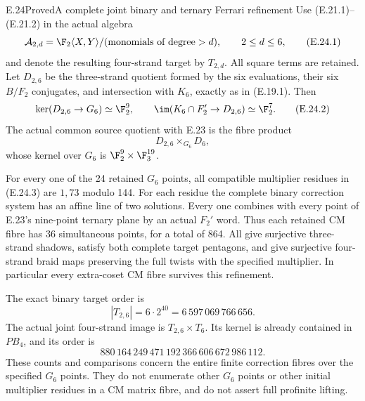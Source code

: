 \begin{statement}{E.24}{Proved}{A complete joint binary and ternary Ferrari refinement}
Use (E.21.1)--(E.21.2) in the actual algebra
\[
 \mathcal A_{2,d}=\F_2\langle X,Y\rangle/
                 (\text{monomials of degree}>d),
 \qquad 2\leq d\leq6,
 \tag{E.24.1}
\]
and denote the resulting four-strand target by
$T_{2,d}$. All square terms are retained.
Let $D_{2,6}$ be the three-strand quotient
formed by the six evaluations, their six
$B/F_2$ conjugates, and intersection with
$K_6$, exactly as in (E.19.1). Then
\[
 \ker(D_{2,6}\to G_6)\simeq\F_2^9,
 \qquad
 \im(K_6\cap F_2'\to D_{2,6})\simeq\F_2^7.
 \tag{E.24.2}
\]
The actual common source quotient with
E.23 is the fibre product
\[
 D_{2,6}\mathbin{\times_{G_6}}D_6,
 \tag{E.24.3}
\]
whose kernel over $G_6$ is
$\F_2^9\times\F_3^{19}$.

For every one of the 24 retained
$G_6$ points, all compatible multiplier
residues in (E.24.3) are $1,73$ modulo
144. For each residue the complete
binary correction system has an
affine line of two solutions.
Every one combines with every
point of E.23's nine-point ternary
plane by an actual $F_2'$ word.
Thus each retained CM fibre has
36 simultaneous points, for a
total of 864. All give surjective
three-strand shadows, satisfy both
complete target pentagons, and
give surjective four-strand braid
maps preserving the full twists
with the specified multiplier.
In particular every extra-coset
CM fibre survives this refinement.

The exact binary target order is
\[
 |T_{2,6}|=6\cdot2^{40}
          =6\,597\,069\,766\,656.
 \tag{E.24.4}
\]
The actual joint four-strand image
is $T_{2,6}\times T_6$. Its
kernel is already contained in
$PB_4$, and its order is
\[
 880\,164\,249\,471\,192\,366\,606\,672\,986\,112.
 \tag{E.24.5}
\]
These counts and comparisons concern
the entire finite correction fibres
over the specified $G_6$ points.
They do not enumerate other $G_6$
points or other initial multiplier
residues in a CM matrix fibre,
and do not assert full profinite
lifting.
\end{statement}

